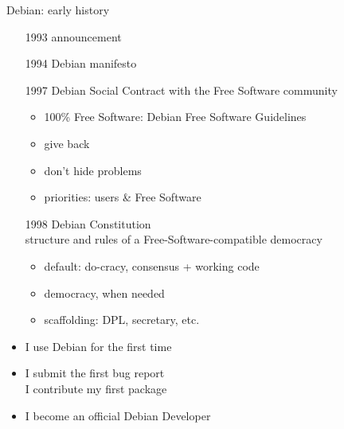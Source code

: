 \documentclass[]{beamer}
\begin{document}
\begin{frame}{Debian: early history }
  \begin{itemize}
  \item[1993] announcement
  \item[1994] Debian manifesto \vfill
  \item[1997] Debian \alert{Social Contract} with the Free Software community
    \begin{itemize}
    \item 100\% Free Software: Debian Free Software Guidelines
    \item give back
    \item don't hide problems
    \item priorities: users \& Free Software
    \end{itemize} \vfill
  \item[1998] Debian \alert{Constitution} \\
    structure and rules of a Free-Software-compatible democracy
    \begin{itemize}
    \item default: do-cracy, consensus + working code
    \item democracy, when needed
    \item scaffolding: DPL, secretary, etc.
    \end{itemize}
  \item<2->[2000] I use Debian for the first time
  \item<2->[2004] I submit the first bug report\\
    I contribute my first package
  \item<2->[2006] I become an official Debian Developer
  \end{itemize}
\end{frame}
\end{document}
